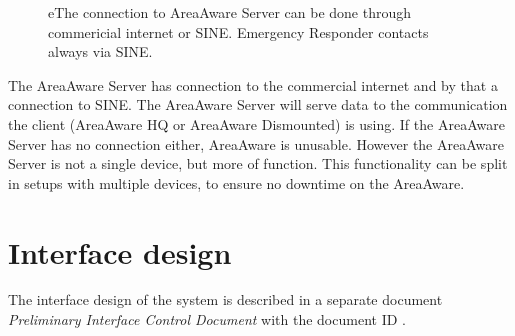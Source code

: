     \begin{figure}[ht]
        \centering
        \quad\quad
        \quad\quad
        \caption{eThe connection to AreaAware Server can be done through commericial internet or SINE. Emergency Responder contacts always via SINE.}
        \label{fig:ce}
    \end{figure}



The AreaAware Server has connection to the commercial internet and by that a connection to SINE.
The AreaAware Server will serve data to the communication the client (AreaAware HQ or AreaAware Dismounted) is using.
If the AreaAware Server has no connection either, AreaAware is unusable.
However the AreaAware Server is not a single device, but more of function.
This functionality can be split in setups with multiple devices, to ensure no downtime on the AreaAware.


\section{Interface design}
\label{sec:arch_interface}
The interface design of the system is described in a separate document \emph{Preliminary Interface Control Document} with the document ID \emph{\picd}.
